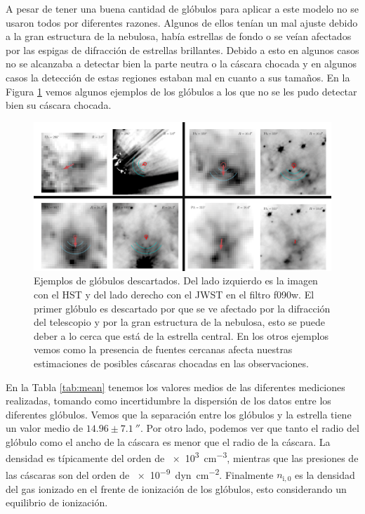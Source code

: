 \documentclass{book}
\begin{document}
A pesar de tener una buena cantidad de glóbulos para aplicar a este
modelo no se usaron todos por diferentes razones. Algunos de ellos
tenían un mal ajuste debido a la gran estructura de la nebulosa, había
estrellas de fondo o se veían afectados por las espigas de difracción
de estrellas brillantes. Debido a esto en algunos casos no se
alcanzaba a detectar bien la parte neutra o la cáscara chocada y en
algunos casos la detección de estas regiones estaban mal en cuanto a
sus tamaños. En la Figura \ref{Bad Globules} vemos algunos ejemplos de
los glóbulos a los que no se les pudo detectar bien su cáscara
chocada.

\begin{figure}[htb]
    \centering
    \includegraphics[width=\textwidth]{Nuevas imagenes finales/Malos_ajustes_final.pdf}
    \caption{Ejemplos de glóbulos descartados. Del lado izquierdo es
      la imagen con el HST y del lado derecho con el JWST en el filtro
      f090w. El primer glóbulo es descartado por que se ve afectado
      por la difracción del telescopio y por la gran estructura de la
      nebulosa, esto se puede deber a lo cerca que está de la estrella
      central. En los otros ejemplos vemos como la presencia de
      fuentes cercanas afecta nuestras estimaciones de posibles
      cáscaras chocadas en las observaciones.}
    \label{Bad Globules}
\end{figure}

En la Tabla \ref{tab:mean} tenemos los valores medios de las
diferentes mediciones realizadas, tomando como incertidumbre la
dispersión de los datos entre los diferentes glóbulos. Vemos que la
separación entre los glóbulos y la estrella tiene un valor medio de
$14.96\pm\SI{7.1}{\arcsecond}$. Por otro lado, podemos ver que tanto el
radio del glóbulo como el ancho de la cáscara es menor que el radio de
la cáscara. La densidad es típicamente del orden de \SI{e3}{cm^{-3}},
mientras que las presiones de las cáscaras son del orden de
\SI{e-9}{dyn.cm^{-2}}. Finalmente $n_\mathrm{i,0}$ es la densidad del
gas ionizado en el frente de ionización de los glóbulos, esto
considerando un equilibrio de ionización.
\end{document}
